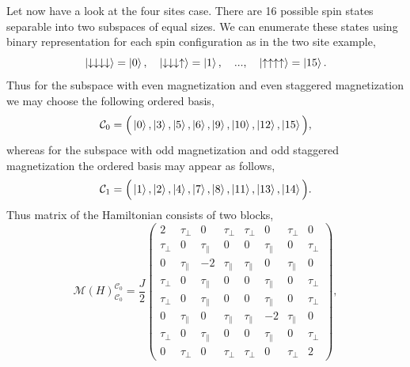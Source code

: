 \documentclass[12pt, a4paper]{article}
\begin{document}
Let now have a look at the four sites case. There are 16 possible spin states separable into two subspaces of equal sizes. We can enumerate these states using binary representation for each spin configuration as in the two site example, 
\begin{equation}
\ket{\downarrow\downarrow\downarrow\downarrow} = \ket{0}, \quad \ket{\downarrow\downarrow\downarrow\uparrow} = \ket{1}, \quad ..., \quad \ket{\uparrow\uparrow\uparrow\uparrow} = \ket{15}.
\end{equation}
Thus for the subspace with even magnetization and even staggered magnetization we may choose the following ordered basis,
\begin{equation}
\mathcal{C}_0 = \Big( \ket{0}, \ket{3}, \ket{5}, \ket{6}, \ket{9}, \ket{10}, \ket{12}, \ket{15} \Big),
\end{equation}
whereas for the subspace with odd magnetization and odd staggered magnetization the ordered basis may appear as follows,
\begin{equation}
\mathcal{C}_1 = \Big( \ket{1}, \ket{2}, \ket{4}, \ket{7}, \ket{8}, \ket{11}, \ket{13}, \ket{14} \Big).
\end{equation}
Thus matrix of the Hamiltonian consists of two blocks,
\begin{equation}
\mathcal{M}(H)_{\mathcal{C}_0}^{\mathcal{C}_0} = \frac{J}{2} \begin{pmatrix}
2 & \tau_{\perp} & 0 & \tau_{\perp} & \tau_{\perp} & 0 & \tau_{\perp} & 0 \\
\tau_{\perp} & 0 & \tau_{\parallel} & 0 & 0 & \tau_{\parallel}  & 0 & \tau_{\perp}\\
0 & \tau_{\parallel}  & -2 & \tau_{\parallel} & \tau_{\parallel}  & 0 & \tau_{\parallel}  & 0 \\
\tau_{\perp}& 0 & \tau_{\parallel} & 0 & 0 & \tau_{\parallel}  & 0 & \tau_{\perp} \\
\tau_{\perp}& 0 & \tau_{\parallel} & 0 & 0 & \tau_{\parallel}  & 0 & \tau_{\perp} \\
0 & \tau_{\parallel}  & 0 & \tau_{\parallel} & \tau_{\parallel}  & -2 & \tau_{\parallel}  & 0 \\
\tau_{\perp} & 0 & \tau_{\parallel} & 0 & 0 & \tau_{\parallel}  & 0 & \tau_{\perp}\\
0 & \tau_{\perp} & 0 & \tau_{\perp} & \tau_{\perp} & 0 & \tau_{\perp} & 2
\end{pmatrix},
\end{equation}
\end{document}
